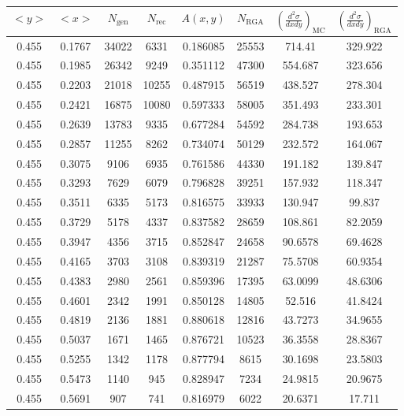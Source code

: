 \begin{table}[h!]
	\centering
	\begin{tabular}{ |c|c|c|c|c|c|c|c| } 
		\hline
		$<y>$ & $<x>$ & $N_{\mathrm{gen}}$ & $N_{\mathrm{rec}}$ & $A(x,y)$ & $N_{\mathrm{RGA}}$ & $\left( \frac{d^2\sigma}{dxdy} \right)_{\mathrm{MC}}$ & $\left( \frac{d^2\sigma}{dxdy} \right)_{\mathrm{RGA}}$ \\
		\hline
		0.455 & 0.1767 & 34022 & 6331 & 0.186085 & 25553 & 714.41 & 329.922 \\ 
		0.455 & 0.1985 & 26342 & 9249 & 0.351112 & 47300 & 554.687 & 323.656 \\ 
		0.455 & 0.2203 & 21018 & 10255 & 0.487915 & 56519 & 438.527 & 278.304 \\ 
		0.455 & 0.2421 & 16875 & 10080 & 0.597333 & 58005 & 351.493 & 233.301 \\
		0.455 & 0.2639 & 13783 & 9335 & 0.677284 & 54592 & 284.738 & 193.653 \\ 
		0.455 & 0.2857 & 11255 & 8262 & 0.734074 & 50129 & 232.572 & 164.067 \\ 
		0.455 & 0.3075 & 9106 & 6935 & 0.761586 & 44330 & 191.182 & 139.847 \\ 
		0.455 & 0.3293 & 7629 & 6079 & 0.796828 & 39251 & 157.932 & 118.347 \\ 
		0.455 & 0.3511 & 6335 & 5173 & 0.816575 & 33933 & 130.947 & 99.837 \\ 
		0.455 & 0.3729 & 5178 & 4337 & 0.837582 & 28659 & 108.861 & 82.2059 \\ 
		0.455 & 0.3947 & 4356 & 3715 & 0.852847 & 24658 & 90.6578 & 69.4628 \\ 
		0.455 & 0.4165 & 3703 & 3108 & 0.839319 & 21287 & 75.5708 & 60.9354 \\ 
		0.455 & 0.4383 & 2980 & 2561 & 0.859396 & 17395 & 63.0099 & 48.6306 \\ 
		0.455 & 0.4601 & 2342 & 1991 & 0.850128 & 14805 & 52.516 & 41.8424 \\ 
		0.455 & 0.4819 & 2136 & 1881 & 0.880618 & 12816 & 43.7273 & 34.9655 \\ 
		0.455 & 0.5037 & 1671 & 1465 & 0.876721 & 10523 & 36.3558 & 28.8367 \\ 
		0.455 & 0.5255 & 1342 & 1178 & 0.877794 & 8615 & 30.1698 & 23.5803 \\ 
		0.455 & 0.5473 & 1140 & 945 & 0.828947 & 7234 & 24.9815 & 20.9675 \\ 
		0.455 & 0.5691 & 907 & 741 & 0.816979 & 6022 & 20.6371 & 17.711 \\ 
		\hline
	\end{tabular}
\end{table}

